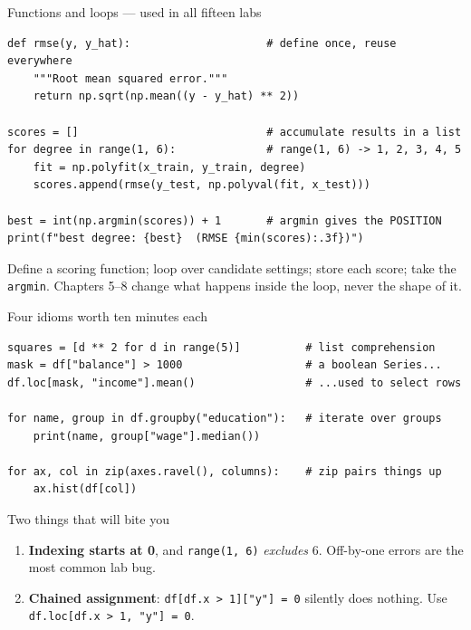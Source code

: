 \documentclass[aspectratio=169,11pt]{beamer}
\begin{document}
\begin{frame}[fragile]{Functions and loops --- used in all fifteen labs}
\begin{lstlisting}
def rmse(y, y_hat):                     # define once, reuse everywhere
    """Root mean squared error."""
    return np.sqrt(np.mean((y - y_hat) ** 2))

scores = []                             # accumulate results in a list
for degree in range(1, 6):              # range(1, 6) -> 1, 2, 3, 4, 5
    fit = np.polyfit(x_train, y_train, degree)
    scores.append(rmse(y_test, np.polyval(fit, x_test)))

best = int(np.argmin(scores)) + 1       # argmin gives the POSITION
print(f"best degree: {best}  (RMSE {min(scores):.3f})")
\end{lstlisting}
  \begin{takeaway}
    Define a scoring function; loop over candidate settings; store each score;
    take the \texttt{argmin}. Chapters 5--8 change what happens inside the
    loop, never the shape of it.
  \end{takeaway}
\end{frame}

\begin{frame}[fragile]{Four idioms worth ten minutes each}
\begin{lstlisting}
squares = [d ** 2 for d in range(5)]          # list comprehension
mask = df["balance"] > 1000                   # a boolean Series...
df.loc[mask, "income"].mean()                 # ...used to select rows

for name, group in df.groupby("education"):   # iterate over groups
    print(name, group["wage"].median())

for ax, col in zip(axes.ravel(), columns):    # zip pairs things up
    ax.hist(df[col])
\end{lstlisting}
  \begin{alertblock}{Two things that will bite you}
    \begin{enumerate}
      \item \textbf{Indexing starts at 0}, and \texttt{range(1, 6)} \emph{excludes}
            6. Off-by-one errors are the most common lab bug.
      \item \textbf{Chained assignment}: \texttt{df[df.x > 1]["y"] = 0} silently
            does nothing. Use \texttt{df.loc[df.x > 1, "y"] = 0}.
    \end{enumerate}
  \end{alertblock}
\end{frame}
\end{document}
